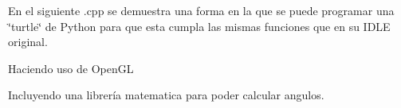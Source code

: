 En el siguiente .cpp se demuestra una forma en la que se puede programar una \char`\"{}turtle\char`\"{} de Python para que esta cumpla las mismas funciones que en su I\+D\+LE original.


\begin{DoxyItemize}
\item Haciendo uso de Open\+GL
\item Incluyendo una librería matematica para poder calcular angulos. 
\end{DoxyItemize}